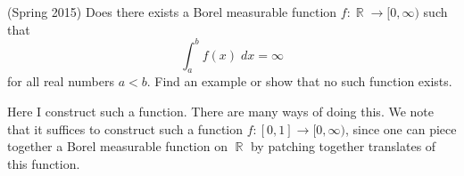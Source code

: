 \documentclass[answers]{exam}
\DeclareMathOperator{\RR}{\mathbb{R}}
\theoremstyle{problemstyle}
\newcommand{\norm}[1]{\left\lVert#1\right\rVert} %
\newcommand{\1}[1]{\textbf{1}_{\left[#1\right]}} %
\def\R{\mathbb{R}} %
\begin{document}
\begin{questions}
\begin{solution}
\begin{comment}
  Let $\epsilon>0$. Since $E$ is measurable and $|E|<\infty$, $\chi_{E}$ is integrable. Since $C_{c}(\R)$ is dense in $L^{1}(\R)$, there exists $g\in C_{c}(\R)$ such that $\norm{g-\chi_{E}}_{L^{1}(\R)}<\epsilon/3$. Since $g$ is continuous and compactly supported, it is unformly continuous. Therefore (again using the fact that $|E|<\infty$) we may choose $\delta>0$ such
  \begin{equation}
    |g(x)-g(y)|< \frac{\epsilon}{3|E|}\label{eq:uniform-continuity}
  \end{equation}
  whenever $|x-y|<\delta$.
Let $r,s\in \R$ such that $|s-r|<\delta$. Writing $f(r)= \int_{\R}\chi_{E}(x)\chi_{E}(x-r)dx$, we have
\begin{align*}
  f(r)-f(s) & = \int_{\R}\chi_{E}(x)\left[\chi_{E}(x-r)-\chi_{E}(x-s)\right]dx\\
            & = \int_{\R}\chi_{E}(x)\left[\chi_{E}(x-r)-g(x-r)+g(x-r)-g(x-s)+g(x-s)-\chi_{E}(x-s)\right]dx.
\end{align*}
Therefore by the triangle inequality,
\begin{align*}
  |f(r)-f(s)| &\leq \int_{\R}\chi_{E}(x)|\chi_{E}(x-r)-g(x-r)|dx + \int_{\R}\chi_{E}(x)|g(x-r)-g(x-s)|dx \\ 
  &\quad +\int_{\R}\chi_{E}|g(x-s)-\chi_{E}(x-s)|dx.\\
              &\leq \int_{\R}|\chi_{E}(x-r)-g(x-r)|dx + \int_{E}|g(x-r)-g(x-s)|dx \\\quad &+\int_{\R}|g(x-s)-\chi_{E}(x-s)|dx.
\end{align*}
By translation invariance (i.e. do a u-substitution), the first and third integrals both equal  $\int_{\R}|\chi_{E}(x)-g(x)|dx < \epsilon/3$. By \eqref{eq:uniform-continuity}, the second integral is less than $\epsilon/3$. Therefore $|f(r)-f(s)|<\epsilon$. We have shown that $\delta$ responds to the $\epsilon$-challenge in the definition of continuity. Therefore $f$ is continuous.
\end{comment}
\end{solution}



\question (Spring 2015) Does there exists a Borel measurable function $f: \RR \to [0,\infty)$ such that
%
\[ \int_a^b f(x)\; dx = \infty \]
%
for all real numbers $a < b$. Find an example or show that no such function exists.
\begin{solution}
    Here I construct such a function. There are many ways of doing this. We note that it suffices to construct such a function $f: [0,1] \to [0,\infty)$, since one can piece together a Borel measurable function on $\RR$ by patching together translates of this function.
    

\end{solution}
\end{questions}
\end{document}
